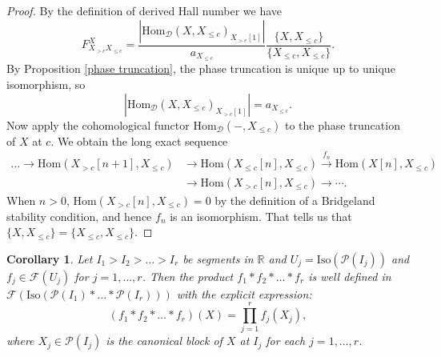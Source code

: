 \documentclass[a4paper,12pt]{amsart}
\numberwithin{equation}{section}
\newtheorem{corollary}[theorem]{Corollary}
\newcommand{\Hom}{\mathrm{Hom}}
\newcommand{\Iso}{\mathrm{Iso}}
\newcommand{\1}{\mathbf{1}}
\begin{document}
\begin{proof}
    By the definition of derived Hall number we have
    \[F_{X_{>c}X_{\leqslant c}}^X=\dfrac{|\Hom_{\mathcal{D}}(X,X_{\leqslant c})_{X_{>c}[1]}|}{a_{X_{\leqslant c}}}\dfrac{\{X,X_{\leqslant c}\}}{\{X_{\leqslant c},X_{\leqslant c}\}}.\]
    By Proposition \ref{phase truncation}, the phase truncation is unique up to unique isomorphism, so
    \[|\Hom_{\mathcal{D}}(X,X_{\leqslant c})_{X_{>c}[1]}|=a_{X_{\leqslant c}}.\]
    Now apply the cohomological functor $\Hom_{\mathcal{D}}(-,X_{\leqslant c})$ to the phase truncation of $X$ at $c$. We obtain the long exact sequence
    \begin{align*}
        \dots\rightarrow\Hom(X_{>c}[n+1],X_{\leqslant c})&\rightarrow\Hom(X_{\leqslant c}[n],X_{\leqslant c})\xrightarrow{f_n}\Hom(X[n],X_{\leqslant c})\\
        &\rightarrow \Hom(X_{>c}[n],X_{\leqslant c})\rightarrow\cdots.
    \end{align*}
    When $n>0$, $\Hom(X_{>c}[n],X_{\leqslant c})=0$ by the definition of a Bridgeland stability condition, and hence $f_n$ is an isomorphism. That tells us that $\{X,X_{\leqslant c}\}=\{X_{\leqslant c},X_{\leqslant c}\}$.
\end{proof}
\begin{corollary}
    Let $I_1>I_2>\dots>I_r$ be segments in $\mathbb{R}$ and $U_j=\Iso(\mathcal{P}(I_j))$ and $f_j\in\mathscr{F}(U_j)$ for $j=1,\dots,r$. Then the product $f_1*f_2*\dots*f_r$ is well defined in $\mathscr{F}(\Iso(\mathcal{P}(I_1)*\dots*\mathcal{P}(I_r)))$ with the explicit expression:
    \[(f_1*f_2*\dots*f_r)(X)=\prod_{j=1}^r f_j(X_j),\]
    where $X_j\in\mathcal{P}(I_j)$ is the canonical block of $X$ at $I_j$ for each $j=1,\dots,r$. 
\end{corollary}
\end{document}
